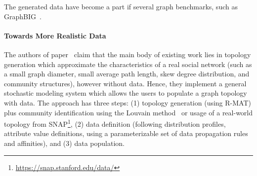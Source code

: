 The generated data have become a part if several graph benchmarks, such as GraphBIG~\cite{Nai:2015:GUG:2807591.2807626}.

\paragraph{Towards More Realistic Data} The authors of paper~\cite{Nettleton2016} claim that the main body of existing work lies in topology generation which approximate the characteristics of a real social network (such as a small graph diameter, small average path length, skew degree distribution, and community structures), however without data. Hence, they implement a general stochastic modeling system which allows the users to populate a graph topology with data. The approach has three steps: (1) topology generation (using R-MAT) plus community identification using the Louvain method~\cite{1742-5468-2008-10-P10008} or usage of a real-world topology from SNAP\footnote{\url{https://snap.stanford.edu/data/}}, (2) data definition (following distribution profiles, attribute value definitions, using a parameterizable set of data propagation rules and affinities), and (3) data population.


